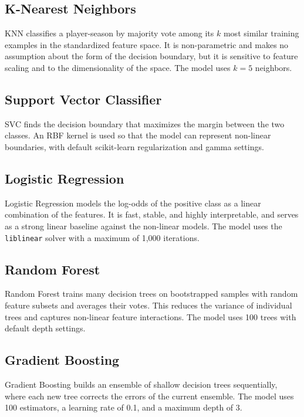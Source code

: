 \documentclass[conference]{IEEEtran}
\begin{document}
\subsection{K-Nearest Neighbors}

KNN classifies a player-season by majority vote among its $k$ most similar training examples in the standardized feature space. It is non-parametric and makes no assumption about the form of the decision boundary, but it is sensitive to feature scaling and to the dimensionality of the space. The model uses $k = 5$ neighbors.

\subsection{Support Vector Classifier}

SVC finds the decision boundary that maximizes the margin between the two classes. An RBF kernel is used so that the model can represent non-linear boundaries, with default scikit-learn regularization and gamma settings.

\subsection{Logistic Regression}

Logistic Regression models the log-odds of the positive class as a linear combination of the features. It is fast, stable, and highly interpretable, and serves as a strong linear baseline against the non-linear models. The model uses the \texttt{liblinear} solver with a maximum of 1{,}000 iterations.

\subsection{Random Forest}

Random Forest trains many decision trees on bootstrapped samples with random feature subsets and averages their votes. This reduces the variance of individual trees and captures non-linear feature interactions. The model uses 100 trees with default depth settings.

\subsection{Gradient Boosting}

Gradient Boosting builds an ensemble of shallow decision trees sequentially, where each new tree corrects the errors of the current ensemble. The model uses 100 estimators, a learning rate of 0.1, and a maximum depth of 3.
\end{document}
